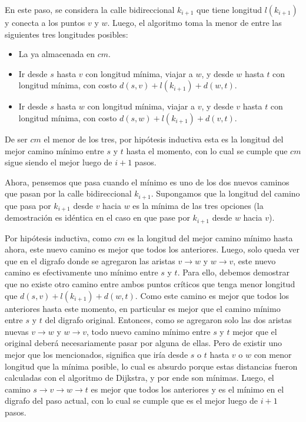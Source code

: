\vspace{1em}

En este paso, se considera la calle bidireccional $k_{i+1}$ que tiene longitud $l(k_{i+1})$ y conecta a los puntos $v$ y $w$. Luego, el algoritmo toma la menor de entre las siguientes tres longitudes posibles:

\begin{itemize}
        \item La ya almacenada en $cm$.
        \item Ir desde $s$ hasta $v$ con longitud mínima, viajar a $w$, y desde $w$ hasta $t$ con longitud mínima, con costo $d(s,v) + l(k_{i+1}) + d(w,t)$.
        \item Ir desde $s$ hasta $w$ con longitud mínima, viajar a $v$, y desde $v$ hasta $t$ con longitud mínima, con costo $d(s,w) + l(k_{i+1}) + d(v,t)$.
\end{itemize}

De ser $cm$ el menor de los tres, por hipótesis inductiva esta es la longitud del mejor camino mínimo entre $s$ y $t$ hasta el momento, con lo cual se cumple que $cm$ sigue siendo el mejor luego de $i+1$ pasos.

\vspace{1em}

Ahora, pensemos que pasa cuando el mínimo es uno de los dos nuevos caminos que pasan por la calle bidireccional $k_{i+1}$. Supongamos que la longitud del camino que pasa por $k_{i+1}$ desde $v$ hacia $w$ es la mínima de las tres opciones (la demostración es idéntica en el caso en que pase por $k_{i+1}$ desde $w$ hacia $v$). 

\vspace{1em}

Por hipótesis inductiva, como $cm$ es la longitud del mejor camino mínimo hasta ahora, este nuevo camino es mejor que todos los anteriores. Luego, solo queda ver que en el digrafo donde se agregaron las aristas $v \rightarrow w$ y $w \rightarrow v$, este nuevo camino es efectivamente uno mínimo entre $s$ y $t$. Para ello, debemos demostrar que no existe otro camino entre ambos puntos críticos que tenga menor longitud que $d(s,v) + l(k_{i+1}) + d(w,t)$. Como este camino es mejor que todos los anteriores hasta este momento, en particular es mejor que el camino mínimo entre $s$ y $t$ del digrafo original. Entonces, como se agregaron solo las dos aristas nuevas $v \rightarrow w$ y $w \rightarrow v$, todo nuevo camino mínimo entre $s$ y $t$ mejor que el original deberá necesariamente pasar por alguna de ellas. Pero de existir uno mejor que los mencionados, significa que iría desde $s$ o $t$ hasta $v$ o $w$ con menor longitud que la mínima posible, lo cual es absurdo porque estas distancias fueron calculadas con el algoritmo de Dijkstra, y por ende son mínimas. Luego, el camino $s \rightarrow v \rightarrow w \rightarrow t$ es mejor que todos los anteriores y es el mínimo en el digrafo del paso actual, con lo cual se cumple que es el mejor luego de $i+1$ pasos.

